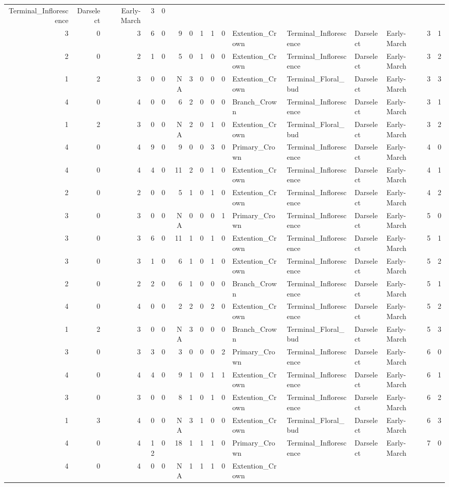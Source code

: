 \documentclass[]{article}
\begin{document}
\begin{longtable}[]{@{}rrrrrrrrrrllllrl@{}}
Terminal\_Inflorescence & Darselect & Early-March & 3 & 0\tabularnewline
3 & 0 & 3 & 6 & 0 & 9 & 0 & 1 & 1 & 0 & Extention\_Crown &
Terminal\_Inflorescence & Darselect & Early-March & 3 & 1\tabularnewline
2 & 0 & 2 & 1 & 0 & 5 & 0 & 1 & 0 & 0 & Extention\_Crown &
Terminal\_Inflorescence & Darselect & Early-March & 3 & 2\tabularnewline
1 & 2 & 3 & 0 & 0 & NA & 3 & 0 & 0 & 0 & Extention\_Crown &
Terminal\_Floral\_bud & Darselect & Early-March & 3 & 3\tabularnewline
4 & 0 & 4 & 0 & 0 & 6 & 2 & 0 & 0 & 0 & Branch\_Crown &
Terminal\_Inflorescence & Darselect & Early-March & 3 & 1\tabularnewline
1 & 2 & 3 & 0 & 0 & NA & 2 & 0 & 1 & 0 & Extention\_Crown &
Terminal\_Floral\_bud & Darselect & Early-March & 3 & 2\tabularnewline
4 & 0 & 4 & 9 & 0 & 9 & 0 & 0 & 3 & 0 & Primary\_Crown &
Terminal\_Inflorescence & Darselect & Early-March & 4 & 0\tabularnewline
4 & 0 & 4 & 4 & 0 & 11 & 2 & 0 & 1 & 0 & Extention\_Crown &
Terminal\_Inflorescence & Darselect & Early-March & 4 & 1\tabularnewline
2 & 0 & 2 & 0 & 0 & 5 & 1 & 0 & 1 & 0 & Extention\_Crown &
Terminal\_Inflorescence & Darselect & Early-March & 4 & 2\tabularnewline
3 & 0 & 3 & 0 & 0 & NA & 0 & 0 & 0 & 1 & Primary\_Crown &
Terminal\_Inflorescence & Darselect & Early-March & 5 & 0\tabularnewline
3 & 0 & 3 & 6 & 0 & 11 & 1 & 0 & 1 & 0 & Extention\_Crown &
Terminal\_Inflorescence & Darselect & Early-March & 5 & 1\tabularnewline
3 & 0 & 3 & 1 & 0 & 6 & 1 & 0 & 1 & 0 & Extention\_Crown &
Terminal\_Inflorescence & Darselect & Early-March & 5 & 2\tabularnewline
2 & 0 & 2 & 2 & 0 & 6 & 1 & 0 & 0 & 0 & Branch\_Crown &
Terminal\_Inflorescence & Darselect & Early-March & 5 & 1\tabularnewline
4 & 0 & 4 & 0 & 0 & 2 & 2 & 0 & 2 & 0 & Extention\_Crown &
Terminal\_Inflorescence & Darselect & Early-March & 5 & 2\tabularnewline
1 & 2 & 3 & 0 & 0 & NA & 3 & 0 & 0 & 0 & Branch\_Crown &
Terminal\_Floral\_bud & Darselect & Early-March & 5 & 3\tabularnewline
3 & 0 & 3 & 3 & 0 & 3 & 0 & 0 & 0 & 2 & Primary\_Crown &
Terminal\_Inflorescence & Darselect & Early-March & 6 & 0\tabularnewline
4 & 0 & 4 & 4 & 0 & 9 & 1 & 0 & 1 & 1 & Extention\_Crown &
Terminal\_Inflorescence & Darselect & Early-March & 6 & 1\tabularnewline
3 & 0 & 3 & 0 & 0 & 8 & 1 & 0 & 1 & 0 & Extention\_Crown &
Terminal\_Inflorescence & Darselect & Early-March & 6 & 2\tabularnewline
1 & 3 & 4 & 0 & 0 & NA & 3 & 1 & 0 & 0 & Extention\_Crown &
Terminal\_Floral\_bud & Darselect & Early-March & 6 & 3\tabularnewline
4 & 0 & 4 & 12 & 0 & 18 & 1 & 1 & 1 & 0 & Primary\_Crown &
Terminal\_Inflorescence & Darselect & Early-March & 7 & 0\tabularnewline
4 & 0 & 4 & 0 & 0 & NA & 1 & 1 & 1 & 0 & Extention\_Crown &

\end{longtable}
\end{document}
